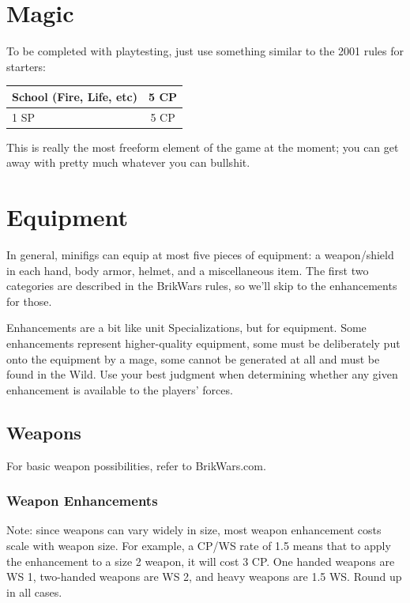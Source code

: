\documentclass[12pt,a4paper,twocolumn]{article}
\begin{document}
\section {Magic}

To be completed with playtesting, just use something similar to the 2001 rules for starters:

\begin{tabular}{|l|c|} \hline
School (Fire, Life, etc) & 5 CP \\ \hline
1 SP & 5 CP \\ \hline
\end{tabular}

This is really the most freeform element of the game at the moment; you can get away with pretty much whatever you can bullshit.

\section{Equipment}

In general, minifigs can equip at most five pieces of equipment: a weapon/shield in each hand, body armor, helmet, and a miscellaneous item.  The first two categories are described in the BrikWars rules, so we'll skip to the enhancements for those.  

Enhancements are a bit like unit Specializations, but for equipment.  Some enhancements represent higher-quality equipment, some must be deliberately put onto the equipment by a mage, some cannot be generated at all and must be found in the Wild.  Use your best judgment when determining whether any given enhancement is available to the players' forces.

\subsection{Weapons}

For basic weapon possibilities, refer to BrikWars.com.

\subsubsection {Weapon Enhancements}

Note: since weapons can vary widely in size, most weapon enhancement costs scale with weapon size.  For example, a CP/WS rate of 1.5 means that to apply the enhancement to a size 2 weapon, it will cost 3 CP.  One handed weapons are WS 1, two-handed weapons are WS 2, and heavy weapons are 1.5 WS.  Round up in all cases.
\end{document}

